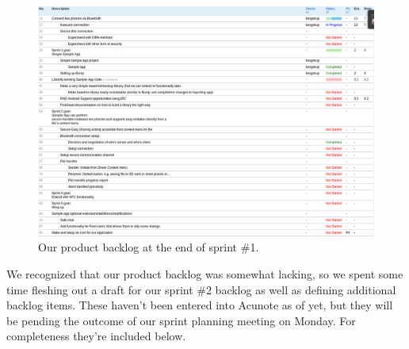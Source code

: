 \documentclass[a4paper,11pt]{article}
\begin{document}
\begin{figure}[ht!]
	\begin{center}
	\includegraphics[width=1.4\textwidth, angle=-90]{productbacklog.png}		
	\end{center}
	\caption{Our product backlog at the end of sprint \#1.}
	\label{productbacklog}
\end{figure}

We recognized that our product backlog was somewhat lacking, so we spent some time fleshing out a draft for our sprint \#2 backlog as well as defining additional backlog items.
These haven't been entered into Acunote as of yet, but they will be pending the outcome of our sprint planning meeting on Monday.
For completeness they're included below.
\end{document}
